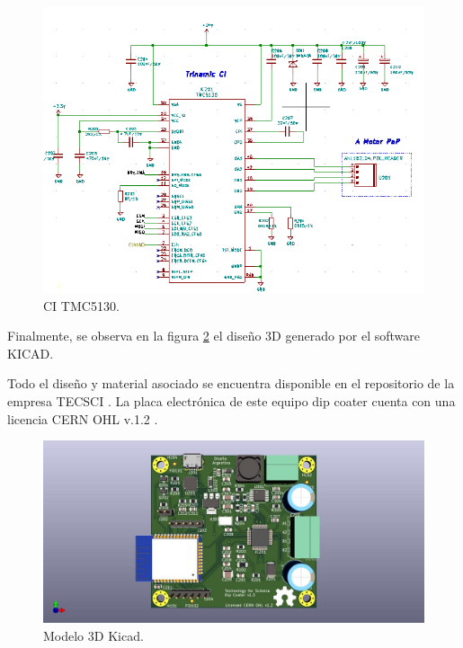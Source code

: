 \begin{figure}[h]
	\centering
	\includegraphics[width=1.2\textwidth]{./Figures/kicad_trinamic.png}
	\caption{CI TMC5130.}
	\label{fig:kicad_trinamic}
\end{figure} 

  
Finalmente, se observa en la figura \ref{fig:dip_3d_model} el diseño 3D generado por el software KICAD.

Todo el diseño y material asociado se encuentra disponible en el repositorio de la empresa TECSCI \citep{web_hardware_tecsci}. La placa electrónica de este equipo dip coater cuenta con una licencia CERN OHL v.1.2 \citep{web_cern_licence}.


\begin{figure}[!h]
	\centering
	\includegraphics[width=1\textwidth]{./Figures/tecsci_dip.jpg}
	\caption{Modelo 3D Kicad.}
	\label{fig:dip_3d_model}
\end{figure}
         



